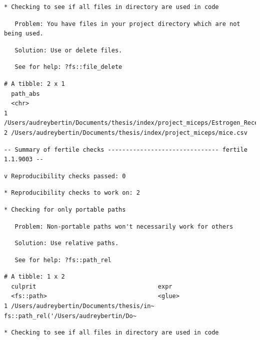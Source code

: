 \documentclass[12pt,twoside]{reedthesis}
\begin{document}
\begin{verbatim}
* Checking to see if all files in directory are used in code
\end{verbatim}
\begin{verbatim}
   Problem: You have files in your project directory which are not being used.
\end{verbatim}
\begin{verbatim}
   Solution: Use or delete files.
\end{verbatim}
\begin{verbatim}
   See for help: ?fs::file_delete
\end{verbatim}
\begin{verbatim}
# A tibble: 2 x 1
  path_abs                                                                      
  <chr>                                                                         
1 /Users/audreybertin/Documents/thesis/index/project_miceps/Estrogen_Receptors.~
2 /Users/audreybertin/Documents/thesis/index/project_miceps/mice.csv            
\end{verbatim}
\begin{verbatim}
-- Summary of fertile checks ------------------------------- fertile 1.1.9003 --
\end{verbatim}
\begin{verbatim}
v Reproducibility checks passed: 0
\end{verbatim}
\begin{verbatim}
* Reproducibility checks to work on: 2
\end{verbatim}
\begin{verbatim}
* Checking for only portable paths
\end{verbatim}
\begin{verbatim}
   Problem: Non-portable paths won't necessarily work for others
\end{verbatim}
\begin{verbatim}
   Solution: Use relative paths.
\end{verbatim}
\begin{verbatim}
   See for help: ?fs::path_rel
\end{verbatim}
\begin{verbatim}
# A tibble: 1 x 2
  culprit                                  expr                                 
  <fs::path>                               <glue>                               
1 /Users/audreybertin/Documents/thesis/in~ fs::path_rel('/Users/audreybertin/Do~
\end{verbatim}
\begin{verbatim}
* Checking to see if all files in directory are used in code
\end{verbatim}
\end{document}
